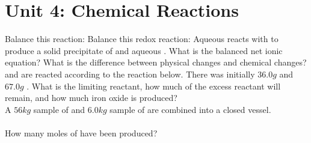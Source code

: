 \documentclass{article}
\begin{document}
\section{Unit 4: Chemical Reactions}
\ProblemSet
Balance this reaction:
\ProblemSet
Balance this redox reaction: 
\ProblemSet
Aqueous  reacts with  to produce a solid precipitate of  and aqueous . What is the balanced net ionic equation? 
\ProblemSet
What is the difference between physical changes and chemical changes?
\ProblemSet
{} and  are reacted according to the reaction below. There was initially \(36.0g\)  and \(67.0g\) . What is the limiting reactant, how much of the excess reactant will remain, and how much iron oxide is produced? \\
\ProblemSet
A \(56kg\) sample of  and \(6.0kg\) sample of  are combined into a closed vessel. \\
 \\
How many moles of  have been produced?
\end{document}
